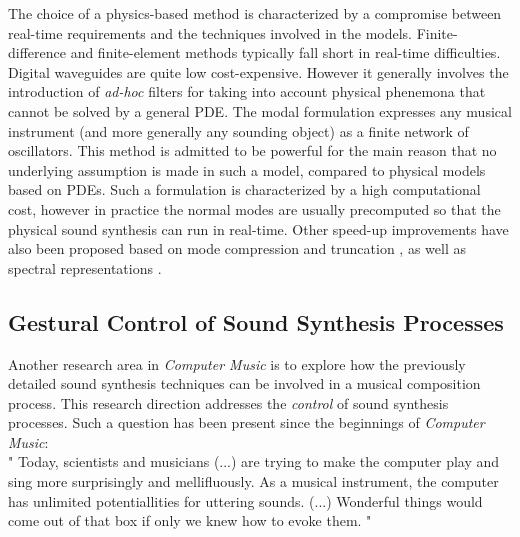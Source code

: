 {{The choice of a physics-based method is characterized by a compromise between real-time requirements and the techniques involved in the models. Finite-difference and finite-element methods typically fall short in real-time difficulties. Digital waveguides are quite low cost-expensive. However it generally involves the introduction of \emph{ad-hoc} filters for taking into account physical phenemona that cannot be solved by a general PDE. The modal formulation expresses any musical instrument (and more generally any sounding object) as a finite network of oscillators. This method is admitted to be powerful for the main reason that no underlying assumption is made in such a model, compared to physical models based on PDEs. Such a formulation is characterized by a high computational cost, however in practice the normal modes are usually precomputed so that the physical sound synthesis can run in real-time. Other speed-up improvements have also been proposed based on mode compression and truncation , as well as spectral representations .


		\subsection{Gestural Control of Sound Synthesis Processes}
		\label{subsec:CM_Control}

Another research area in \emph{Computer Music} is to explore how the previously detailed sound synthesis techniques can be involved in a musical composition process. This research direction addresses the \emph{control} of sound synthesis processes. Such a question has been present since the beginnings of \emph{Computer Music}:\\

" Today, scientists and musicians (...) are trying to make the computer play and sing more surprisingly and mellifluously. As a musical instrument, the computer has unlimited potentiallities for uttering sounds. (...) Wonderful things would come out of that box if only we knew how to evoke them. " \\


}}
